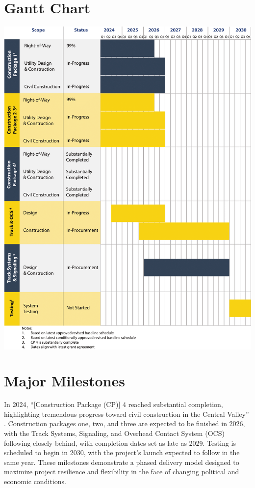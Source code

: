 \section{Gantt Chart \citep{ureport2025}}
\noindent \centering
\vspace*{1em}
\includegraphics[width=\linewidth]{./attachments/timeline}
\justifying

\section{Major Milestones}
\parindent20pt In 2024, “[Construction Package (CP)] 4 reached substantial completion, highlighting tremendous progress toward civil construction in the Central Valley” \citep{ureport2025}. Construction packages one, two, and three are expected to be finished in 2026, with the Track Systems, Signaling, and Overhead Contact System (OCS) following closely behind, with completion dates set as late as 2029. Testing is scheduled to begin in 2030, with the project’s launch expected to follow in the same year. These milestones demonstrate a phased delivery model designed to maximize project resilience and flexibility in the face of changing political and economic conditions. \par